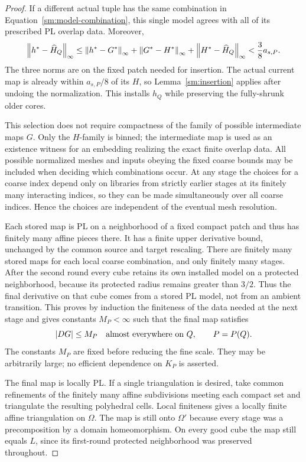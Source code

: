 \begin{proof}
If a different actual tuple has the same
combination in Equation~\eqref{sm:model-combination}, this
single model agrees with all of its prescribed
PL overlap data.  Moreover,
\begin{equation}
 \label{sm:reuse-error}
 \left\lVert h^*-\widehat H_Q\right\rVert_{\infty}
 \le \left\lVert h^*-G^*\right\rVert_{\infty}
     +\left\lVert G^*-H^*\right\rVert_{\infty}
     +\left\lVert H^*-\widehat H_Q\right\rVert_{\infty}
 <\frac38 a_{s,P}.
\end{equation}
The three norms are on the fixed patch needed
for insertion.  The actual current map is
already within $a_{s,P}/8$ of its $H$, so
Lemma~\ref{sm:insertion} applies after undoing
the normalization.  This installs $h_Q$ while
preserving the fully-shrunk older cores.

This selection does not require compactness of
the family of possible intermediate maps $G$.
Only the $H$-family is binned; the intermediate
map is used as an existence witness for an
embedding realizing the exact finite overlap
data.  All possible normalized meshes and
inputs obeying the fixed coarse bounds may
be included when deciding which combinations
occur.  At any stage the choices for a coarse
index depend only on libraries from strictly
earlier stages at its finitely many interacting
indices, so they can be made simultaneously
over all coarse indices.  Hence the choices are independent of
the eventual mesh resolution.

Each stored map is PL on a neighborhood of a
fixed compact patch and thus has finitely many
affine pieces there.  It has a finite upper
derivative bound, unchanged by the common source and target
rescaling.  There are finitely many
stored maps for each local coarse combination,
and only finitely many stages.  After the second round every cube
retains its own installed model on a protected neighborhood,
because its protected radius remains greater than $3/2$.
Thus the final derivative on that cube comes from a stored PL
model, not from an ambient transition.  This proves by induction
the finiteness of the data needed at the next stage and gives
constants $M_P<\infty$ such that the final map satisfies
\begin{equation}
 \label{sm:model-derivative-bound}
 |DG|\le M_P\quad\hbox{almost everywhere on }Q,
 \qquad P=P(Q).
\end{equation}
The constants $M_P$ are fixed before reducing
the fine scale.  They may be arbitrarily large;
no efficient dependence on $K_P$ is asserted.

The final map is locally PL.  If a single triangulation is
desired, take common refinements of the
finitely many affine subdivisions meeting
each compact set and triangulate the resulting
polyhedral cells.  Local finiteness gives a
locally finite affine triangulation on
$\Omega$.  The map is still onto $\Omega'$
because every stage was a precomposition by
a domain homeomorphism.  On every good cube
the map still equals $L$, since its first-round
protected neighborhood was preserved throughout.


\end{proof}
